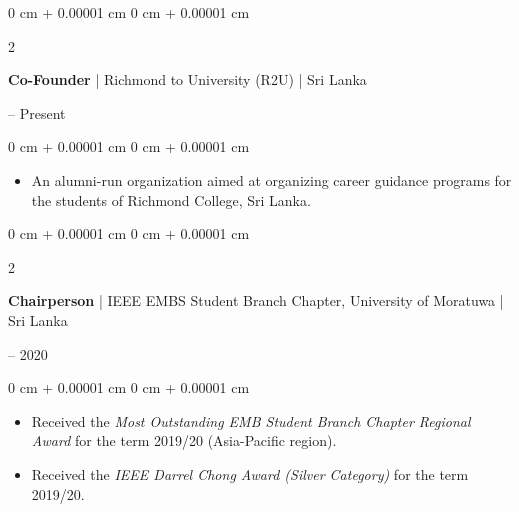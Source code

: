 \documentclass[10pt, letterpaper]{article}
\newenvironment{highlights}{
    \begin{itemize}[
        topsep=0.10 cm,
        parsep=0.10 cm,
        partopsep=0pt,
        itemsep=0pt,
        leftmargin=0 cm + 10pt
    ]
}{
    \end{itemize}
} %
\newenvironment{onecolentry}{
    \begin{adjustwidth}{
        0 cm + 0.00001 cm
    }{
        0 cm + 0.00001 cm
    }
}{
    \end{adjustwidth}
} %
\newenvironment{twocolentry}[2][]{
    \onecolentry
    \def\secondColumn{#2}
    \setcolumnwidth{\fill, 4.5 cm}
    \begin{paracol}{2}
}{
    \switchcolumn \raggedleft \secondColumn
    \end{paracol}
    \endonecolentry
} %
\begin{document}
    \vspace{0.2 cm}

    \begin{twocolentry}{2018 -- Present}
    \textbf{Co-Founder} | Richmond to University (R2U) | Sri Lanka
    \end{twocolentry}
    \vspace{0.10 cm}
    \begin{onecolentry}
        \begin{highlights}
            \item An alumni-run organization aimed at organizing career guidance programs for the students of Richmond College, Sri Lanka.
        \end{highlights}
    \end{onecolentry}

    \vspace{0.2 cm}

    \begin{twocolentry}{2019 -- 2020}
    \textbf{Chairperson} | IEEE EMBS Student Branch Chapter, University of Moratuwa | Sri Lanka
    \end{twocolentry}
    \vspace{0.10 cm}
    \begin{onecolentry}
        \begin{highlights}
            \item Received the \textit{Most Outstanding EMB Student Branch Chapter Regional Award} for the term 2019/20 (Asia-Pacific region).
            \item Received the \textit{IEEE Darrel Chong Award (Silver Category)} for the term 2019/20.
        \end{highlights}
    \end{onecolentry}
\end{document}
